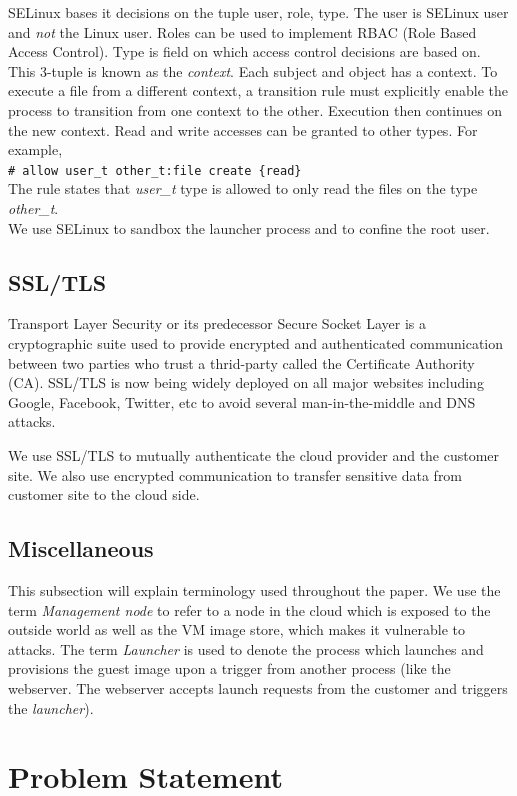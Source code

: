 \documentclass[10pt,twocolumn,pdftex]{article}
\begin{document}
SELinux bases it decisions on the tuple {user, role, type}. The user is SELinux user and \emph{not} the Linux user. Roles can be used to implement RBAC (Role Based Access Control). Type is field on which access control decisions are based on. This 3-tuple is known as the \emph{context}. Each subject and object has a context. To execute a file from a different context, a transition rule must explicitly enable the process to transition from one context to the other. Execution then continues on the new context. Read and write accesses can be granted to other types. For example,\\
{\tt \# allow user\_t other\_t:file create \{read\}} \\
The rule states that \emph{user\_t} type is allowed to only read the files on the type \emph{other\_t}.\\

We use SELinux to sandbox the launcher process and to confine the root user.

\subsection{SSL/TLS}
Transport Layer Security or its predecessor Secure Socket Layer is a cryptographic suite used to provide encrypted and authenticated communication between two parties who trust a thrid-party called the Certificate Authority (CA). SSL/TLS is now being widely deployed on all major websites including Google, Facebook, Twitter, etc to avoid several man-in-the-middle and DNS attacks. 

We use SSL/TLS to mutually authenticate the cloud provider and the customer site. We also use encrypted communication to transfer sensitive data from customer site to the cloud side.

\subsection{Miscellaneous}
This subsection will explain terminology used throughout the paper.
We use the term \emph{Management node} to refer to a node in the cloud which is exposed to the outside world as well as the VM image store, which makes it vulnerable to attacks. The term \emph{Launcher} is used to denote the process which launches and provisions the guest image upon a trigger from another process (like the webserver. The webserver accepts launch requests from the customer and triggers the \emph{launcher}). 

\section{Problem Statement}
\label{sec:problem}
\end{document}
